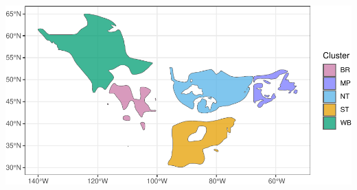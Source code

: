 \documentclass[
]{book}
\begin{document}
\includegraphics[width=0.7\linewidth]{Mignette_files/figure-latex/unnamed-chunk-29-1}

  
\end{document}
